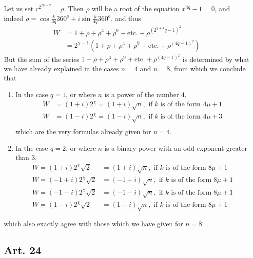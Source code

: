\documentclass{book}
\theoremstyle{plain}
\theoremstyle{remark}
\begin{document}
Let us set $r^{2^{2\chi-2}} = \rho$.  Then $\rho$ will be a root of the equation $x^{4q}-1 = 0$, and indeed $\rho = \cos \frac{k}{4q} 360^o + i \sin \frac{k}{4q} 360^o$, and thus
\begin{align*} W &= 1 + \rho + \rho^4 + \rho^9 + \textrm{etc.} + \rho^{(2^{\chi+1}q-1)^2} \\
&= 2^{\chi-1} \left(1 + \rho + \rho^4 + \rho^9 + \textrm{etc.} + \rho^{(4q-1)^2}\right) 
\end{align*}
But the sum of the series $1 + \rho + \rho^4 + \rho^9 + \textrm{etc.} + \rho^{(4q-1)^2} $ is determined by what we have already explained in the cases $n=4$ and $n=8$, from which we conclude that 
\begin{enumerate}
\item[ ]In the case $q=1$, or where $n$ is a power of the number $4$, 
\begin{align*}
W&= (1+i)2^{\chi} = (1+i)\sqrt{n}, \textrm{ if }k\textrm{ is of the form } 4\mu +1 \\
W&= (1-i)2^{\chi} = (1-i)\sqrt{n}, \textrm{ if }k\textrm{ is of the form } 4\mu +3 \\
\end{align*}
which are the very formulas already given for $n=4$.
\item[ ] In the case $q=2$, or where $n$ is a binary power with an odd exponent greater than $3$, 
\begin{align*}
W = (1+i)2^{\chi}\sqrt{2} &= (1+i)\sqrt{n}, \textrm{ if }k\textrm{ is of the form } 8 \mu + 1 \\ 
W = (-1+i)2^{\chi}\sqrt{2} &= (-1+i)\sqrt{n}, \textrm{ if }k\textrm{ is of the form } 8 \mu + 1 \\
W = (-1-i)2^{\chi}\sqrt{2} &= (-1-i)\sqrt{n}, \textrm{ if }k\textrm{ is of the form } 8 \mu + 1 \\
W = (1-i)2^{\chi}\sqrt{2} &= (1-i)\sqrt{n}, \textrm{ if }k\textrm{ is of the form } 8 \mu + 1 
\end{align*}
\end{enumerate}
which also exactly agree with those which we have given for $n=8$. 

\subsection*{Art. 24}
\end{document}

